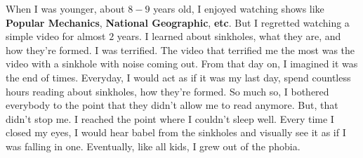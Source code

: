 When I was younger, about $8 - 9$ years old, I enjoyed watching shows like
\textbf{Popular Mechanics}, \textbf{National Geographic}, \textbf{etc}. But I
regretted watching a simple video for almost $2$ years. I learned about
sinkholes, what they are, and how they're formed. I was terrified. The video
that terrified me the most was the video with a sinkhole with noise coming out.
From that day on, I imagined it was the end of times. Everyday, I would act as
if it was my last day, spend countless hours reading about sinkholes, how
they're formed. So much so, I bothered everybody to the point that they didn't
allow me to read anymore. But, that didn't stop me. I reached the point where I
couldn't sleep well. Every time I closed my eyes, I would hear babel from the
sinkholes and visually see it as if I was falling in one. Eventually, like all
kids, I grew out of the phobia.
